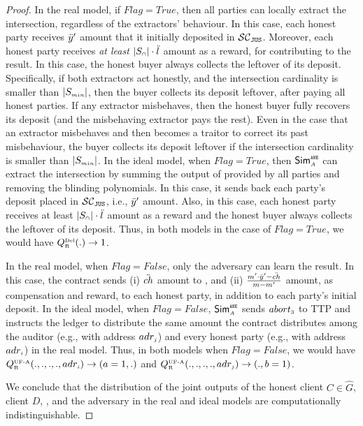 \begin{proof}
In the real model, if $Flag=True$, then all parties can locally extract the intersection, regardless of the extractors' behaviour. In this case, each honest party receives $\ddot{y}'$ amount that it initially deposited in $\mathcal{SC}_{\mathtt{JUS}}$. Moreover, each honest party receives \emph{at least} $|S_{\scriptscriptstyle\cap}|\cdot \ddot{l}$ amount as a reward, for contributing to the result. In this case, the honest buyer always collects the leftover of its deposit. Specifically, if both extractors act honestly, and the intersection cardinality is smaller than $|S_{\scriptscriptstyle min}|$, then the buyer collects its deposit leftover, after paying all honest parties. If any extractor misbehaves, then the honest buyer fully recovers its deposit (and the misbehaving extractor pays the rest). Even in the case that an extractor misbehaves and then becomes a traitor to correct its past misbehaviour, the buyer collects its deposit leftover if the intersection cardinality is smaller than $|S_{\scriptscriptstyle min}|$.  In the ideal model, when $Flag=True$, then $\mathsf{Sim}^{\scriptscriptstyle \mathtt{ANE}}_{\scriptscriptstyle A}$ can extract the intersection by summing the output of \vopr provided by all parties and removing the blinding polynomials. In this case, it sends back each party's deposit placed in $\mathcal{SC}_{\mathtt{JUS}}$, i.e., $\ddot{y}'$ amount. Also, in this case, each honest party receives at least $|S_{\scriptscriptstyle\cap}|\cdot \ddot{l}$ amount as a reward and the honest buyer always collects the leftover of its deposit. Thus, in both models in the case of $Flag=True$, we would have $Q^{\scriptscriptstyle \text{Del}}_{\scriptscriptstyle\text{R}}(.)\rightarrow 1$. 




In the real model, when $Flag=False$, only the adversary can learn the result. In this case, the contract sends (i) $\ddot{ch}$ amount to \aud, and (ii) $\frac{m'\cdot \ddot{y}'-\ddot{ch}}{m-m'}$ amount, as compensation and reward, to each honest party, in addition to each party's initial deposit. In the ideal model,  when $Flag=False$, $\mathsf{Sim}^{\scriptscriptstyle \mathtt{ANE}}_{\scriptscriptstyle A}$ sends $abort_{\scriptscriptstyle 3}$ to TTP and instructs the ledger to distribute the same amount the contract distributes among the auditor (e.g., with address $adr_{\scriptscriptstyle j}$) and every honest party (e.g., with address $adr_{\scriptscriptstyle i}$) in the real model.  Thus, in both models when $Flag=False$, we would have $Q^{\scriptscriptstyle \text{UF-A}}_{\scriptscriptstyle \text{R}}(., ., ., ., adr_{\scriptscriptstyle i})\rightarrow (a=1, .)$ and  $Q^{\scriptscriptstyle \text{UF-A}}_{\scriptscriptstyle \text{R}}(., ., ., ., adr_{\scriptscriptstyle j})\rightarrow (., b=1)$. 

We conclude that the distribution of the joint outputs of the honest client $C\in \hat G$, client $D$, \aud, and the adversary in the real and ideal models are computationally indistinguishable.








\end{proof}
